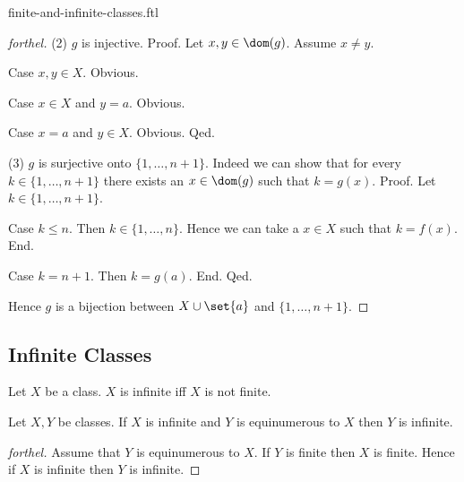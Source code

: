 \documentclass{naproche-library}
\begin{document}
\begin{smodule}{finite-and-infinite-classes.ftl}
\begin{proof}[forthel]
    (2) $g$ is injective. \newline
    Proof.
      Let $x, y \in \dom(g)$.
      Assume $x \neq y$.
      
      Case $x, y \in X$. Obvious.

      Case $x \in X$ and $y = a$. Obvious.

      Case $x = a$ and $y \in X$. Obvious.
    Qed.

    (3) $g$ is surjective onto $\{ 1, \dots, n + 1 \}$.
    Indeed we can show that for every $k \in \{1, \dots, n + 1 \}$ there exists an $x \in \dom(g)$ such that $k = g(x)$. \newline
    Proof.
      Let $k \in \{ 1, \dots, n + 1 \}$.

      Case $k \leq n$.
        Then $k \in \{ 1, \dots, n \}$.
        Hence we can take a $x \in X$ such that $k = f(x)$.
      End.

      Case $k = n + 1$.
        Then $k = g(a)$.
      End.
    Qed.

    Hence $g$ is a bijection between $X \cup \set{a}$ and $\{ 1, \dots, n + 1 \}$.
  \end{proof}


  \subsection*{Infinite Classes}

  \begin{definition}[forthel,id=FOUNDATIONS_14_6612510618681344]
    Let $X$ be a class.
    $X$ is infinite iff $X$ is not finite.
  \end{definition}

  \begin{proposition}[forthel,id=FOUNDATIONS_14_5814530911240192]
    Let $X, Y$ be classes.
    If $X$ is infinite and $Y$ is equinumerous to $X$ then $Y$ is infinite.
  \end{proposition}
  \begin{proof}[forthel]
    Assume that $Y$ is equinumerous to $X$.
    If $Y$ is finite then $X$ is finite.
    Hence if $X$ is infinite then $Y$ is infinite.
  \end{proof}
\end{smodule}
\end{document}
